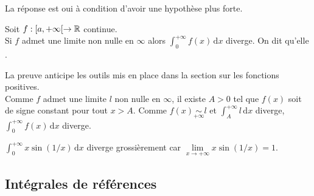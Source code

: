 \documentclass{book}
\begin{document}
 La réponse est oui à condition d'avoir une hypothèse plus forte. 
\begin{Theoreme}
Soit $f : [a,+\infty[ \to \mathbb{R}$ continue.\\
Si $f$ admet une limite non nulle en $\infty$ alors $\int_{0}^{+\infty}f(x)\,\mathrm dx$ diverge. On dit qu'elle . 
\end{Theoreme}
\begin{Demonstration}
La preuve anticipe les outils mis en place dans la section sur les fonctions positives.\\ 
Comme $f$ admet une limite $l$ non nulle en $\infty$, il existe $A>0$ tel que $f(x)$ soit de signe constant pour tout $x>A$.  Comme $f(x)\underset{+\infty}{\sim} l$ et $\int_{A}^{+\infty}l\,\mathrm dx$ diverge,  $\int_{0}^{+\infty}f(x)\,\mathrm dx$ diverge.  
\end{Demonstration} 
\begin{Exemple}
$\int_{0}^{+\infty}x\sin(1/x)\,\mathrm dx$ diverge grossièrement car $\lim\limits_{x\to+\infty}x\sin(1/x) =1 $.
\end{Exemple}

\subsection{Intégrales de références}
\end{document}
